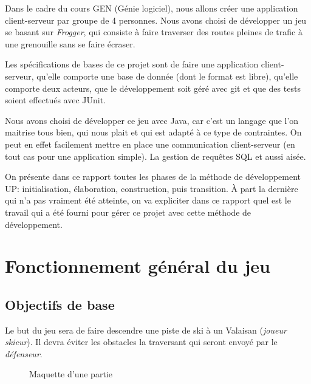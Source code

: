 \documentclass[a4paper,12pt]{article}
\begin{document}
	
	Dans le cadre du cours GEN (Génie logiciel), nous allons créer une application client-serveur par groupe de 4 personnes. Nous avons choisi de développer un jeu se basant sur \textit{Frogger}, qui consiste à faire traverser des routes pleines de trafic à une grenouille sans se faire écraser. 
	
	Les spécifications de bases de ce projet sont de faire une application client-serveur, qu'elle comporte une base de donnée (dont le format est libre), qu'elle comporte deux acteurs, que le développement soit géré avec git et que des tests soient effectués avec JUnit.
	
	Nous avons choisi de développer ce jeu avec Java, car c'est un langage que l'on maitrise tous bien, qui nous plait et qui est adapté à ce type de contraintes. On peut en effet facilement mettre en place une communication client-serveur (en tout cas pour une application simple). La gestion de requêtes SQL et aussi aisée. 
	
	On présente dans ce rapport toutes les phases de la méthode de développement UP: initialisation, élaboration, construction, puis transition. À part la dernière qui n'a pas vraiment été atteinte, on va expliciter dans ce rapport quel est le travail qui a été fourni pour gérer ce projet avec cette méthode de développement.
	
	\section{Fonctionnement général du jeu}
	
	
	\subsection{Objectifs de base}
	
	Le but du jeu sera de faire descendre une piste de ski à un Valaisan (\textit{joueur skieur}). Il devra éviter les obstacles la traversant qui seront envoyé par le \textit{défenseur}.
	
	\begin{figure}[h!]
		\centering
		\caption{Maquette d'une partie}
		\label{fig:maquette}
	\end{figure}
	
\end{document}
